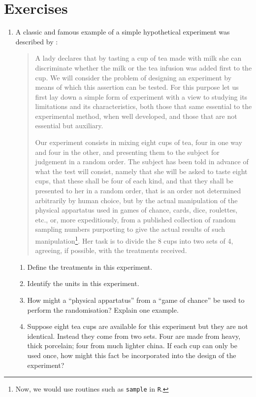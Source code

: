 \documentclass[
]{book}
\providecommand{\tightlist}{%
  \setlength{\itemsep}{0pt}\setlength{\parskip}{0pt}}
\theoremstyle{definition}
\theoremstyle{definition}
\theoremstyle{definition}
\theoremstyle{definition}
\theoremstyle{remark}
\begin{document}
\hypertarget{exercises}{%
\section{Exercises}\label{exercises}}

\begin{enumerate}
\def\labelenumi{\arabic{enumi}.}
\item
  \citep[Adapted from][]{Morris2011} A classic and famous example of a simple hypothetical experiment was described by \citet{Fisher1935}:

  \begin{quote}
  A lady declares that by tasting a cup of tea made with milk she can discriminate whether the milk or the tea infusion was added first to the cup. We will consider the problem of designing an experiment by means of which this assertion can be tested. For this purpose let us first lay down a simple form of experiment with a view to studying its limitations and its characteristics, both those that same essential to the experimental method, when well developed, and those that are not essential but auxiliary.

  Our experiment consists in mixing eight cups of tea, four in one way and four in the other, and presenting them to the subject for judgement in a random order. The subject has been told in advance of what the test will consist, namely that she will be asked to taste eight cups, that these shall be four of each kind, and that they shall be presented to her in a random order, that is an order not determined arbitrarily by human choice, but by the actual manipulation of the physical appartatus used in games of chance, cards, dice, roulettes, etc., or, more expeditiously, from a published collection of random sampling numbers purporting to give the actual results of such manipulation\footnote{Now, we would use routines such as \texttt{sample} in \texttt{R}.}. Her task is to divide the 8 cups into two sets of 4, agreeing, if possible, with the treatments received.
  \end{quote}

  \begin{enumerate}
  \def\labelenumii{\alph{enumii}.}
  \tightlist
  \item
    Define the treatments in this experiment.
  \item
    Identify the units in this experiment.
  \item
    How might a ``physical appartatus'' from a ``game of chance'' be used to perform the randomisation? Explain one example.
  \item
    Suppose eight tea cups are available for this experiment but they are not identical. Instead they come from two sets. Four are made from heavy, thick porcelain; four from much lighter china. If each cup can only be used once, how might this fact be incorporated into the design of the experiment?
  \end{enumerate}
\end{enumerate}
\end{document}
